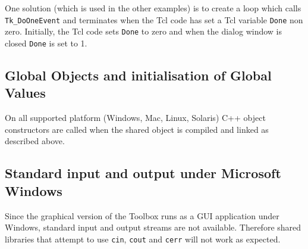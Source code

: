 \documentclass[\pformat,12pt]{article}
\begin{document}
One solution (which is used in the other examples) is to create a loop
which calls {\tt Tk\_DoOneEvent} and terminates when the Tcl code has
set a Tcl variable {\tt Done} non zero. Initially, the Tcl code sets
{\tt Done} to zero and when the dialog window is closed {\tt Done} is
set to 1.

\subsection{Global Objects and initialisation of Global Values}
\label{sec:globalvalues}

On all supported platform (Windows, Mac, Linux, Solaris) C++ object
constructors are called when the shared object is compiled and linked
as described above.

\subsection{Standard input and output under Microsoft Windows}

Since the graphical version of the Toolbox runs as a GUI application
under Windows, standard input and output streams are not
available. Therefore shared libraries that attempt to use
\texttt{cin}, \texttt{cout} and \texttt{cerr} will not work as
expected. 
\end{document}
